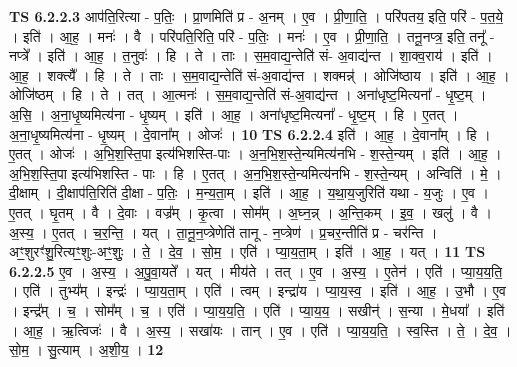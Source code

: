 \documentclass[17pt]{extarticle}
\begin{document}
                  \newline
                                \textbf{ TS 6.2.2.3} \newline
                  आप॑ति॒रित्या - प॒तिः॒ । प्रा॒णमिति॑ प्र - अ॒नम् । ए॒व । प्री॒णा॒ति॒ । परि॑पतय॒ इति॒ परि॑ - प॒त॒ये॒ । इति॑ । आ॒ह॒ । मनः॑ । वै । परि॑पति॒रिति॒ परि॑ - प॒तिः॒ । मनः॑ । ए॒व । प्री॒णा॒ति॒ । तनू॒नप्त्र॒ इति॒ तनू᳚ - नप्त्रे᳚ । इति॑ । आ॒ह॒ । त॒नुवः॑ । हि । ते । ताः । स॒म॒वाद्य॒न्तेति॑ सं- अ॒वाद्य॑न्त । शा॒क्व॒राय॑ । इति॑ । आ॒ह॒ । शक्त्यै᳚ । हि । ते । ताः । स॒म॒वाद्य॒न्तेति॑ सं-अ॒वाद्य॑न्त । शक्मन्न्॑ । ओजि॑ष्ठाय । इति॑ । आ॒ह॒ । ओजि॑ष्ठम् । हि । ते । तत् । आ॒त्मनः॑ । स॒म॒वाद्य॒न्तेति॑ सं-अ॒वाद्य॑न्त । अना॑धृष्ट॒मित्यना᳚ - धृ॒ष्ट॒म् । अ॒सि॒ । अ॒ना॒धृ॒ष्यमित्य॑ना - धृ॒ष्यम् । इति॑ । आ॒ह॒ । अना॑धृष्ट॒मित्यना᳚ - धृ॒ष्ट॒म् । हि । ए॒तत् । अ॒ना॒धृ॒ष्यमित्य॑ना - धृ॒ष्यम् । दे॒वाना᳚म् । ओजः॑ । \textbf{  10} \newline
                  \newline
                                \textbf{ TS 6.2.2.4} \newline
                  इति॑ । आ॒ह॒ । दे॒वाना᳚म् । हि । ए॒तत् । ओजः॑ । अ॒भि॒श॒स्ति॒पा इत्य॑भिशस्ति-पाः । अ॒न॒भि॒श॒स्ते॒न्यमित्य॑नभि - श॒स्ते॒न्यम् । इति॑ । आ॒ह॒ । अ॒भि॒श॒स्ति॒पा इत्य॑भिशस्ति - पाः । हि । ए॒तत् । अ॒न॒भि॒श॒स्ते॒न्यमित्य॑नभि - श॒स्ते॒न्यम् । अन्विति॑ । मे॒ । दी॒क्षाम् । दी॒क्षाप॑ति॒रिति॑ दी॒क्षा - प॒तिः॒ । म॒न्य॒ता॒म् । इति॑ । आ॒ह॒ । य॒था॒य॒जुरिति॑ यथा - य॒जुः । ए॒व । ए॒तत् । घृ॒तम् । वै । दे॒वाः । वज्र᳚म् । कृ॒त्वा । सोम᳚म् । अ॒घ्न॒न्न् । अ॒न्ति॒कम् । इ॒व॒ । खलु॑ । वै । अ॒स्य॒ । ए॒तत् । च॒र॒न्ति॒ । यत् । ता॒नू॒न॒प्त्रेणेति॑ तानू - न॒प्त्रेण॑ । प्र॒चर॒न्तीति॑ प्र - चर॑न्ति । अꣳ॒॒शुरꣳ॑शु॒रित्यꣳ॒॒शुः-अꣳ॒॒शुः॒ । ते॒ । दे॒व॒ । सो॒म॒ । एति॑ । प्या॒य॒ता॒म् । इति॑ । आ॒ह॒ । यत् । \textbf{  11} \newline
                  \newline
                                \textbf{ TS 6.2.2.5} \newline
                  ए॒व । अ॒स्य॒ । अ॒पु॒वा॒यते᳚ । यत् । मीय॑ते । तत् । ए॒व । अ॒स्य॒ । ए॒तेन॑ । एति॑ । प्या॒य॒य॒ति॒ । एति॑ । तुभ्य᳚म् । इन्द्रः॑ । प्या॒य॒ता॒म् । एति॑ । त्वम् । इन्द्रा॑य । प्या॒य॒स्व॒ । इति॑ । आ॒ह॒ । उ॒भौ । ए॒व । इन्द्र᳚म् । च॒ । सोम᳚म् । च॒ । एति॑ । प्या॒य॒य॒ति॒ । एति॑ । प्या॒य॒य॒ । सखीन्॑ । स॒न्या । मे॒धया᳚ । इति॑ । आ॒ह॒ । ऋ॒त्विजः॑ । वै । अ॒स्य॒ । सखा॑यः । तान् । ए॒व । एति॑ । प्या॒य॒य॒ति॒ । स्व॒स्ति । ते॒ । दे॒व॒ । सो॒म॒ । सु॒त्याम् । अ॒शी॒य॒ । \textbf{  12} \newline
                  \newline
\end{document}
